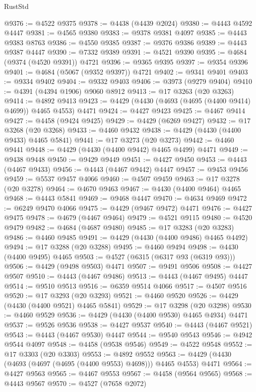 \begin{lexlean}{RustStd}
\begin{coremodule}
@9376 := @4522 @9375
@9378 := @4438 (@4439 @2024)
@9380 := @4443 @4592 @4447
@9381 := @4565 @9380
@9383 := @9378 @9381 @4097
@9385 := @4443 @9383 @8763
@9386 := @4550 @9385
@9387 := @9376 @9386
@9389 := @4443 @9387 @4447
@9390 := @7332 @9389
@9391 := @4521 @9390
@9395 := @4684 (@9374 (@4520 @9391)) @4721
@9396 := @9365 @9395
@9397 := @9354 @9396
@9401 := @4684 (@5067 (@9352 @9397)) @4721
@9402 := @9341 @9401
@9403 := @9334 @9402
@9404 := @9332 @9403
@9406 := @3973 (@9279 @9404)
@9410 := @4391 (@4394 @1906) @9060 @8912
@9413 := @17 @3263 (@20 @3263)
@9414 := @4892 @9413
@9423 := @4429 (@4430 (@4693 (@4695 (@4400 @9414) @4699)) @4465 @4553) @4471
@9424 := @4427 @9423
@9425 := @4467 @9414
@9427 := @4458 (@9424 @9425)
@9429 := @4429 (@6269 @9427)
@9432 := @17 @3268 (@20 @3268)
@9433 := @4460 @9432
@9438 := @4429 (@4430 (@4400 @9433) @4465 @5841)
@9441 := @17 @3273 (@20 @3273)
@9442 := @4460 @9441
@9448 := @4429 (@4430 (@4400 @9442) @4465 @4499) @4471
@9449 := @9438 @9448
@9450 := @9429 @9449
@9451 := @4427 @9450
@9453 := @4443 (@4467 @9433)
@9456 := @4443 (@4467 @9442) @4447
@9457 := @9453 @9456
@9459 := @5537 @9457 @4066
@9460 := @4507 @9459
@9463 := @17 @3278 (@20 @3278)
@9464 := @4670 @9463
@9467 := @4430 (@4400 @9464) @4465
@9468 := @4443 @5841
@9469 := @9468 @4447
@9470 := @4634 @9469
@9472 := @6249 @9470 @4066
@9475 := @4429 (@9467 @9472) @4471
@9476 := @4427 @9475
@9478 := @4679 (@4467 @9464)
@9479 := @4521 @9115
@9480 := @4520 @9479
@9482 := @4684 (@4687 @9480)
@9485 := @17 @3283 (@20 @3283)
@9486 := @4460 @9485
@9491 := @4429 (@4430 (@4400 @9486) @4465 @4492)
@9494 := @17 @3288 (@20 @3288)
@9495 := @4460 @9494
@9498 := @4430 (@4400 @9495) @4465
@9503 := @4527 (@6315 (@6317 @93 (@6319 @93)))
@9506 := @4429 (@9498 @9503) @4471
@9507 := @9491 @9506
@9508 := @4427 @9507
@9510 := @4443 (@4467 @9486)
@9513 := @4443 (@4467 @9495) @4447
@9514 := @9510 @9513
@9516 := @6359 @9514 @4066
@9517 := @4507 @9516
@9520 := @17 @3293 (@20 @3293)
@9521 := @4460 @9520
@9526 := @4429 (@4430 (@4400 @9521) @4465 @5841)
@9529 := @17 @3298 (@20 @3298)
@9530 := @4460 @9529
@9536 := @4429 (@4430 (@4400 @9530) @4465 @4934) @4471
@9537 := @9526 @9536
@9538 := @4427 @9537
@9540 := @4443 (@4467 @9521)
@9543 := @4443 (@4467 @9530) @4447
@9544 := @9540 @9543
@9546 := @4942 @9544 @4097
@9548 := @4458 (@9538 @9546)
@9549 := @4522 @9548
@9552 := @17 @3303 (@20 @3303)
@9553 := @4892 @9552
@9563 := @4429 (@4430 (@4693 (@4697 (@4695 (@4400 @9553) @4698))) @4465 @4553) @4471
@9564 := @4427 @9563
@9565 := @4467 @9553
@9567 := @4458 (@9564 @9565)
@9568 := @4443 @9567
@9570 := @4527 (@7658 @2072)

\end{coremodule}
\end{lexlean}
